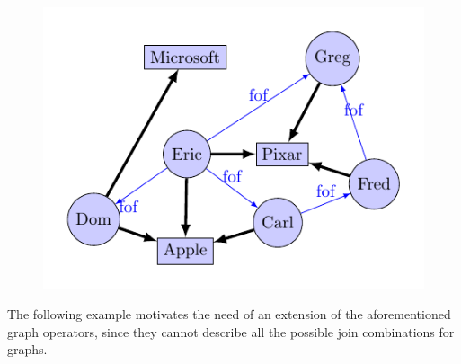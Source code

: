\begin{figure}
\begin{minipage}[t]{0.3\textwidth}
		\label{fig:osnforleftjoin}
	\end{minipage}\quad
	\begin{minipage}[t]{0.3\textwidth}
		\includegraphics[scale=.6]{fig/03joins/aaa_left_merged2_prev}
		\label{fig:leftjoindesiredsol}
	\end{minipage}
\end{figure}
The following example motivates the need of an extension of the aforementioned graph operators, since they cannot describe all the possible join combinations for graphs.

